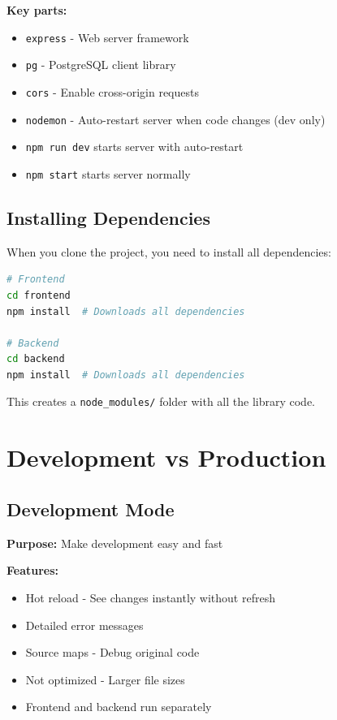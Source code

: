 \documentclass[12pt,a4paper]{article}
\begin{document}
\textbf{Key parts:}
\begin{itemize}
    \item \texttt{express} - Web server framework
    \item \texttt{pg} - PostgreSQL client library
    \item \texttt{cors} - Enable cross-origin requests
    \item \texttt{nodemon} - Auto-restart server when code changes (dev only)
    \item \texttt{npm run dev} starts server with auto-restart
    \item \texttt{npm start} starts server normally
\end{itemize}

\subsection{Installing Dependencies}

When you clone the project, you need to install all dependencies:

\begin{lstlisting}[language=bash]
# Frontend
cd frontend
npm install  # Downloads all dependencies

# Backend
cd backend
npm install  # Downloads all dependencies
\end{lstlisting}

This creates a \texttt{node\_modules/} folder with all the library code.

\section{Development vs Production}

\subsection{Development Mode}

\textbf{Purpose:} Make development easy and fast

\textbf{Features:}
\begin{itemize}
    \item Hot reload - See changes instantly without refresh
    \item Detailed error messages
    \item Source maps - Debug original code
    \item Not optimized - Larger file sizes
    \item Frontend and backend run separately
\end{itemize}
\end{document}
